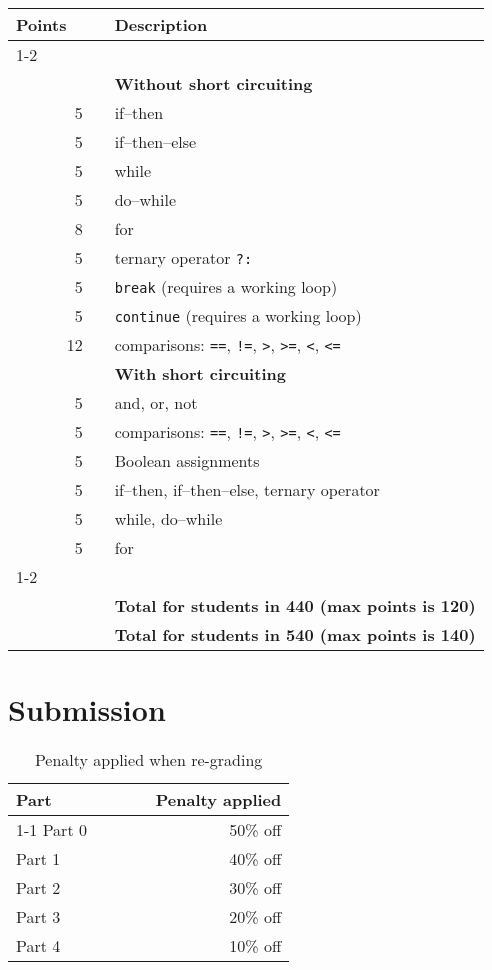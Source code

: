 \documentclass{article}
\makeatletter
\newcommand{\parser}{2}
\newcommand{\typecheck}{3}
\newcommand{\codegen}{4}
\newcommand{\gradeline}{ \cline{1-2} \cline{4-4} ~\\[-1.5ex] }
\newenvironment{gradetable}{\begin{longtable}{@{~~}rrcp{5in}} \multicolumn{2}{l}{\bf Points} & & {\bf Description}\\ \gradeline}{\end{longtable}}
\newcommand{\mainitem}[2]{\pagebreak[2] {\bf #1} &&& {\bf #2}}
\newcommand{\inneritem}[2]{~ & #1 && #2}
\makeatother
\begin{document}
\begin{gradetable}
  \mainitem{55}{Without short circuiting}
  \\[1mm]
  \inneritem{5}{if--then}
  \\[1mm]
  \inneritem{5}{if--then--else}
  \\[1mm]
  \inneritem{5}{while}
  \\[1mm]
  \inneritem{5}{do--while}
  \\[1mm]
  \inneritem{8}{for}
  \\[1mm]
  \inneritem{5}{ternary operator {\tt ?:}}
  \\[1mm]
  \inneritem{5}{{\tt break} (requires a working loop)}
  \\[1mm]
  \inneritem{5}{{\tt continue} (requires a working loop)}
  \\[1mm]
  \inneritem{12}{comparisons: {\tt ==}, {\tt !=}, {\tt >}, {\tt >=}, {\tt <}, {\tt <=} }
  \\[4mm]

  \mainitem{30}{With short circuiting}
  \\[1mm]
  \inneritem{5}{and, or, not}
  \\[1mm]
  \inneritem{5}{comparisons: {\tt ==}, {\tt !=}, {\tt >}, {\tt >=}, {\tt <}, {\tt <=} }
  \\[1mm]
  \inneritem{5}{Boolean assignments}
  \\[1mm]
  \inneritem{5}{if--then, if--then--else, ternary operator}
  \\[1mm]
  \inneritem{5}{while, do--while}
  \\[1mm]
  \inneritem{5}{for}
  \\[4mm]

  \gradeline
  \mainitem{100}{Total for students in 440 (max points is 120)}
  \\
  \mainitem{120}{Total for students in 540 (max points is 140)}
\end{gradetable}


\section{Submission}

\begin{table}[h]
\centering

  \begin{tabular}{lcr}
    {\bf Part} & ~~~~ & {\bf Penalty applied} \\ \cline{1-1}\cline{3-3}
    Part 0 && 50\% off \\
    Part 1 && 40\% off \\
    Part \parser && 30\% off \\
    Part \typecheck && 20\% off \\
    Part \codegen && 10\% off
  \end{tabular}

\caption{Penalty applied when re-grading}
\label{TAB:penalties}
\end{table}
\end{document}
